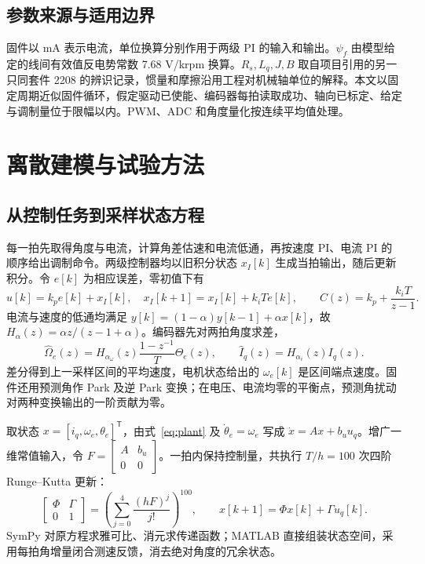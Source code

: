\documentclass[UTF8,fontset=windows,11pt,a4paper]{ctexart}
\begin{document}
\subsection{参数来源与适用边界}
固件以 mA 表示电流，单位换算分别作用于两级 PI 的输入和输出。$\psi_f$ 由模型给定的线间有效值反电势常数 7.68 V/krpm 换算。$R_s,L_q,J,B$ 取自项目引用的另一只同套件 2208 的辨识记录，惯量和摩擦沿用工程对机械轴单位的解释\cite{model}。本文以固定周期近似固件循环，假定驱动已使能、编码器每拍读取成功、轴向已标定、给定与调制量位于限幅以内。PWM、ADC 和角度量化按连续平均值处理。

\newpage
\section{离散建模与试验方法}
\subsection{从控制任务到采样状态方程}
每一拍先取得角度与电流，计算角差估速和电流低通，再按速度 PI、电流 PI 的顺序给出调制命令。两级控制器均以旧积分状态 $x_I[k]$ 生成当拍输出，随后更新积分\cite{firmware}。令 $e[k]$ 为相应误差，零初值下有
\begin{equation}
 u[k]=k_pe[k]+x_I[k],\quad x_I[k+1]=x_I[k]+k_iTe[k],
 \qquad C(z)=k_p+\frac{k_iT}{z-1}. \label{eq:pi}
\end{equation}
电流与速度的低通均满足 $y[k]=(1-\alpha)y[k-1]+\alpha x[k]$，故 $H_\alpha(z)=\alpha z/(z-1+\alpha)$。编码器先对两拍角度求差，
\begin{equation}
 \widehat{\Omega}_e(z)=H_{\alpha_\omega}(z)\frac{1-z^{-1}}{T}\Theta_e(z),
 \qquad \widehat I_q(z)=H_{\alpha_i}(z)I_q(z).\label{eq:sensor}
\end{equation}
差分得到上一采样区间的平均速度，电机状态给出的 $\omega_e[k]$ 是区间端点速度。固件还用预测角作 Park 及逆 Park 变换；在电压、电流均零的平衡点，预测角扰动对两种变换输出的一阶贡献为零。

取状态 $x=[i_q,\omega_e,\theta_e]^\mathsf T$，由式~\eqref{eq:plant} 及 $\dot\theta_e=\omega_e$ 写成 $\dot x=Ax+b_u u_q$。增广一维常值输入，令 $F=\left[\begin{smallmatrix}A&b_u\\0&0\end{smallmatrix}\right]$。一拍内保持控制量，共执行 $T/h=100$ 次四阶 Runge--Kutta 更新：
\begin{equation}
 \begin{bmatrix}\Phi&\Gamma\\0&1\end{bmatrix}
 =\left(\sum_{j=0}^{4}\frac{(hF)^j}{j!}\right)^{100},\qquad
 x[k+1]=\Phi x[k]+\Gamma u_q[k]. \label{eq:rk4}
\end{equation}
SymPy 对原方程求雅可比、消元求传递函数\cite{sympy,analysis}；MATLAB 直接组装状态空间，采用每拍角增量闭合测速反馈，消去绝对角度的冗余状态\cite{analysis}。
\end{document}
